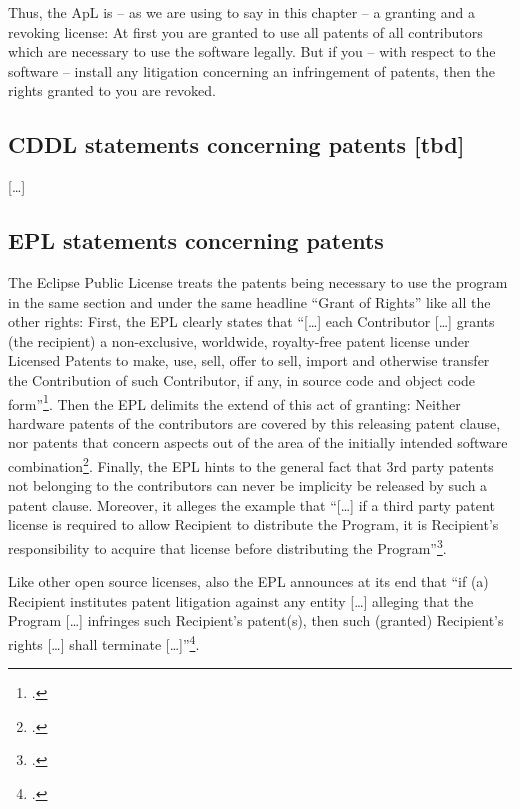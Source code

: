Thus, the ApL is -- as we are using to say in this chapter -- a granting and a
revoking license: At first you are granted to use all patents of all
contributors which are necessary to use the software legally. But if you -- with
respect to the software -- install any litigation concerning an infringement of
patents, then the rights granted to you are revoked.

\subsection{CDDL statements concerning patents [tbd]}\label{subsec:CddlPatentClause}
[\ldots]

\subsection{EPL statements concerning patents}\label{subsec:EpLPatentClause}

The Eclipse Public License treats the patents being necessary to use the program
in the same section and under the same headline \enquote{Grant of Rights} like
all the other rights: First, the EPL clearly states that \enquote{[\ldots] each
Contributor [\ldots] grants (the recipient) a non-exclusive, worldwide,
royalty-free patent license under Licensed Patents to make, use, sell, offer to
sell, import and otherwise transfer the Contribution of such Contributor, if
any, in source code and object code form}\footcite[cf.][\nopage wp
§2.b]{Epl10OsiLicense2005a}. Then the EPL delimits the extend of this act of
granting: Neither hardware patents of the contributors are covered by this
releasing patent clause, nor patents that concern aspects out of the area of the
initially intended software combination\footcite[cf.][\nopage wp
§2.b]{Epl10OsiLicense2005a}. Finally, the EPL hints to the general fact that
3rd party patents not belonging to the contributors can never be implicity be
released by such a patent clause. Moreover, it alleges the example that
\enquote{[\ldots] if a third party patent license is required to allow Recipient
to distribute the Program, it is Recipient's responsibility to acquire that
license before distributing the Program}\footcite[cf.][\nopage wp
§2.c]{Epl10OsiLicense2005a}.

Like other open source licenses, also the EPL announces at its end that
\enquote{if (a) Recipient institutes patent litigation against any entity
[\ldots] alleging that the Program [\ldots] infringes such Recipient's
patent(s), then such (granted) Recipient's rights [\ldots] shall terminate
[\ldots]}\footcite[cf.][\nopage wp §7]{Epl10OsiLicense2005a}.

